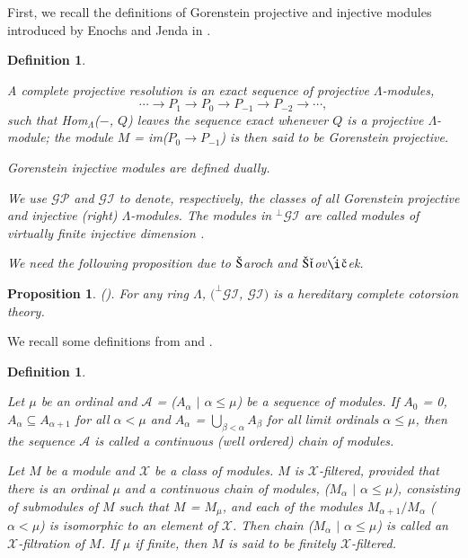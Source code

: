 \documentclass[11pt,a4paper]{article}
\newtheorem{prop}[thm]{Proposition}
\newtheorem{defn}[thm]{Definition}
\begin{document}
First, we recall the definitions of Gorenstein projective and   injective
   modules introduced by Enochs and Jenda in \cite{eno9}.


\begin{defn} \label{defn1} \rm{
 A  {\it  complete projective resolution} is an exact sequence of projective
 $\Lambda$-modules,  $$\cdots  \rightarrow P_{1} \rightarrow P_{0}\rightarrow
P_{-1}\rightarrow P_{-2}\rightarrow \cdots,  $$
 such that Hom$_{\Lambda}$($-$, $Q$) leaves the sequence exact whenever $Q$ is a projective   $\Lambda$-module; the module $M$ = im($P_{0}\rightarrow
P_{-1}$) is then  said to be {\it Gorenstein  projective}.

{\it Gorenstein  injective }  modules are defined dually.

 We use $\mathscr{GP}$ and $\mathscr{GI}$    to denote, respectively,  the classes of all Gorenstein  projective and  injective
   (right)  $\Lambda$-modules.  The modules in $^\perp\mathscr{GI}$ are called {\it modules of  virtually finite  injective
  dimension} \cite{bel}.

We need   the following    proposition  due to $\check{\rm S}$aroch and $\check{\rm S}$$\check{\rm t}$ov$\acute{\rm {\i}}$$\check{\rm c}$ek.}\end{defn}
\begin{prop}\label{prop1} {\rm (\cite[Theorem 5.6]{ss})}. For any ring $\Lambda$, $(^\perp\mathscr{GI}$, $\mathscr{GI})$ is a hereditary complete
  cotorsion theory.   \end{prop}

We recall some definitions from \cite{gbe} and \cite{eno5}.

 \begin{defn} \label{defn2} \rm{Let $\mu$ be an ordinal and $\mathscr{A}$ = ($A_{\alpha} $ $|$ $\alpha \leq \mu$) be a sequence of modules.
  If $A_{0} $ = 0,  $A_{\alpha} \subseteq  A_{\alpha + 1}$ for all $\alpha < \mu$ and   $A_{\alpha} $ = $\bigcup_{\beta < \alpha} A_{\beta} $ for all
 limit ordinals $\alpha \leq \mu$, then the sequence $\mathscr{A}$  is called a {\it continuous {\rm (}well ordered{\rm )} chain of modules.}

   Let $M$ be a module and $\mathscr{X}$ be a class of modules. $M$ is  $\mathscr{X}$-{\it filtered}, provided that there is an ordinal $\mu$
   and  a continuous chain of modules, ($M_{\alpha} $ $|$ $\alpha \leq \mu$), consisting of submodules of $M$ such that $M$ = $M_{\mu} $,
    and each of the modules $M_{\alpha + 1}/M_{\alpha}  $  ($\alpha < \mu$) is isomorphic to an element of $\mathscr{X}$. Then chain ($M_{\alpha} $ $|$ $\alpha \leq \mu$)
   is called an $\mathscr{X}$-{\it filtration} of $M$. If $\mu$ if finite, then  $M$ is said to be {\it finitely} $\mathscr{X}$-{\it filtered}.}\end{defn}
\end{document}
